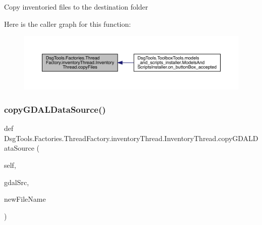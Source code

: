 \begin{DoxyVerb}Copy inventoried files to the destination folder
\end{DoxyVerb}
 Here is the caller graph for this function\+:
\nopagebreak
\begin{figure}[H]
\begin{center}
\leavevmode
\includegraphics[width=350pt]{class_dsg_tools_1_1_factories_1_1_thread_factory_1_1inventory_thread_1_1_inventory_thread_a3c6dd527c4ca93af4a542d505ebe99f6_icgraph}
\end{center}
\end{figure}
\mbox{\label{class_dsg_tools_1_1_factories_1_1_thread_factory_1_1inventory_thread_1_1_inventory_thread_a6e4afaa58fc22a337235d79b6aa06f6d}} 
\subsubsection{\texorpdfstring{copy\+G\+D\+A\+L\+Data\+Source()}{copyGDALDataSource()}}
{\footnotesize\ttfamily def Dsg\+Tools.\+Factories.\+Thread\+Factory.\+inventory\+Thread.\+Inventory\+Thread.\+copy\+G\+D\+A\+L\+Data\+Source (\begin{DoxyParamCaption}\item[{}]{self,  }\item[{}]{gdal\+Src,  }\item[{}]{new\+File\+Name }\end{DoxyParamCaption})}

